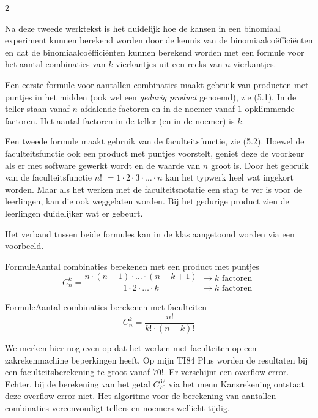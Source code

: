 \begin{multicols}{2}

Na deze tweede werktekst is het duidelijk hoe de kansen in een binomiaal experiment kunnen berekend worden door de kennis van de binomiaalcoëfficiënten en dat de binomiaalcoëfficiënten kunnen berekend worden met een formule voor het aantal combinaties van $k$ vierkantjes uit een reeks van $n$ vierkantjes. 

Een eerste formule voor aantallen combinaties maakt gebruik van producten met puntjes in het midden (ook wel een \emph{gedurig product} genoemd), zie (5.1). In de teller staan vanaf $n$ afdalende factoren en in de noemer vanaf $1$ opklimmende factoren. Het aantal factoren in de teller (en in de noemer) is $k$.

Een tweede formule maakt gebruik van de faculteitsfunctie, zie (5.2). Hoewel de faculteitsfunctie ook een product met puntjes voorstelt, geniet deze de voorkeur als er met software gewerkt wordt en de waarde van $n$ groot is. Door het gebruik van de faculteitsfunctie $n$! $=1 \cdot 2 \cdot 3 \cdot \ldots \cdot n$ kan het typwerk heel wat ingekort worden. Maar als het werken met de faculteitsnotatie een stap te ver is voor de leerlingen, kan die ook weggelaten worden. Bij het gedurige product zien de leerlingen duidelijker wat er gebeurt.

Het verband tussen beide formules kan in de klas aangetoond worden via een voorbeeld. 

\begin{kader}{Formule}{Aantal combinaties berekenen met een product met puntjes}
\begin{equation}
    C^k_n=\frac{n \cdot (n-1) \cdot \ldots \cdot (n-k+1)}{1 \cdot 2 \cdot \ldots \cdot k}
    \begin{array}{l}
        \rightarrow k \text{ factoren}\\
        \rightarrow k \text{ factoren}
    \end{array}
\end{equation}
\end{kader}

\clearpage

\begin{kader}{Formule}{Aantal combinaties berekenen met faculteiten}
\begin{equation}
    C^k_n=\frac{n!}{k! \cdot (n-k)!}
\end{equation}
\end{kader}

 We merken hier nog even op dat het werken met faculteiten op een zakrekenmachine beperkingen heeft. Op mijn TI84 Plus worden de resultaten bij een faculteitsberekening te groot vanaf $70!$. Er verschijnt een overflow-error. Echter, bij de berekening van het getal $C^{32}_{70}$ via het menu Kansrekening ontstaat deze overflow-error niet. Het algoritme voor de berekening van aantallen combinaties vereenvoudigt tellers en noemers wellicht tijdig.
 

\end{multicols}
